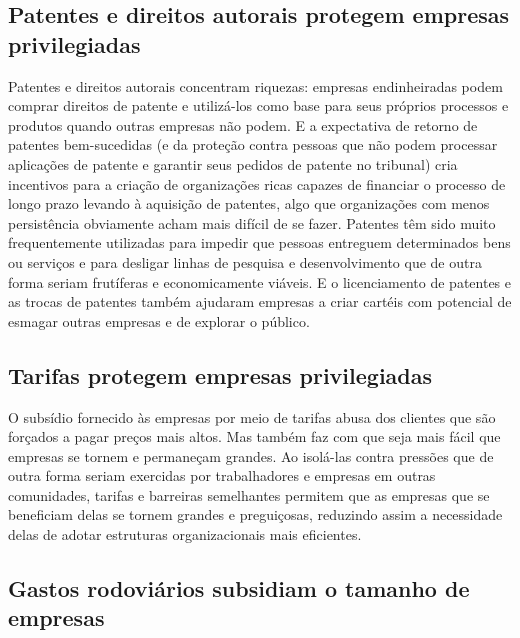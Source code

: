 \subsection*{Patentes e direitos autorais protegem empresas privilegiadas}

Patentes e direitos autorais concentram riquezas: empresas endinheiradas podem comprar direitos de patente e utilizá-los como base para seus próprios processos e produtos quando outras empresas não podem. E a expectativa de retorno de patentes bem-sucedidas (e da proteção contra pessoas que não podem processar aplicações de patente e garantir seus pedidos de patente no tribunal) cria incentivos para a criação de organizações ricas capazes de financiar o processo de longo prazo levando à aquisição de patentes, algo que organizações com menos persistência obviamente acham mais difícil de se fazer. Patentes têm sido muito frequentemente utilizadas para impedir que pessoas entreguem determinados bens ou serviços e para desligar linhas de pesquisa e desenvolvimento que de outra forma seriam frutíferas e economicamente viáveis. E o licenciamento de patentes e as trocas de patentes também ajudaram empresas a criar cartéis com potencial de esmagar outras empresas e de explorar o público.

\subsection*{Tarifas protegem empresas privilegiadas}

O subsídio fornecido às empresas por meio de tarifas abusa dos clientes que são forçados a pagar preços mais altos. Mas também faz com que seja mais fácil que empresas se tornem e permaneçam grandes. Ao isolá-las contra pressões que de outra forma seriam exercidas por trabalhadores e empresas em outras comunidades, tarifas e barreiras semelhantes permitem que as empresas que se beneficiam delas se tornem grandes e preguiçosas, reduzindo assim a necessidade delas de adotar estruturas organizacionais mais eficientes.

\subsection*{Gastos rodoviários subsidiam o tamanho de empresas}

